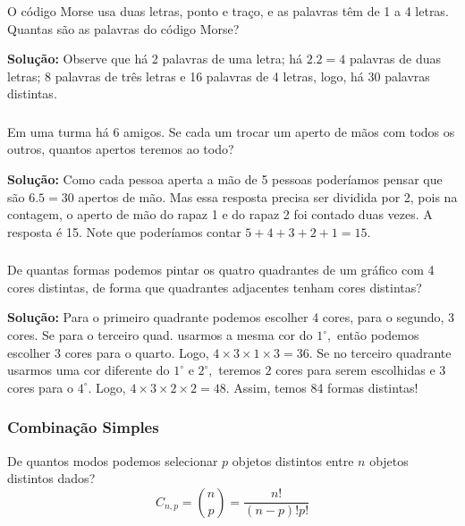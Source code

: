 \documentclass[14pt,aspectratio=1610]{beamer}
\begin{document}
\begin{frame}{}
\frametitle{}
\begin{block}{}
\justifying
O código Morse usa duas letras, ponto e traço, e as palavras têm de 1 a 4 letras. Quantas são as palavras do código Morse?\pause

{\bf Solução:} Observe que há 2 palavras de uma letra; há $2.2=4$ palavras de duas letras; 8 palavras de três letras e 16 palavras de 4 letras, logo, há 30 palavras distintas.
\end{block}
\end{frame}


\begin{frame}{}
\frametitle{}
\begin{block}{}
\justifying
Em uma turma há 6 amigos. Se cada um trocar um aperto de mãos com todos os outros, quantos apertos teremos ao todo?\pause

{\bf Solução:} Como cada pessoa aperta a mão de 5 pessoas poderíamos pensar que são $6.5=30$ apertos de mão. Mas essa resposta precisa ser dividida por 2, pois na contagem, o aperto de mão do rapaz 1 e do rapaz 2 foi contado duas vezes. A resposta é 15. Note que poderíamos contar $5+4+3+2+1=15.$
\end{block}
\end{frame}

\begin{frame}{}
\frametitle{}
\begin{block}{}
\justifying
De quantas formas podemos pintar os quatro quadrantes de um gráfico com 4 cores distintas, de forma que quadrantes adjacentes tenham cores distintas? \pause

{\bf Solução:} Para o primeiro quadrante podemos escolher 4 cores, para o segundo, 3 cores. Se para o terceiro quad. usarmos a mesma cor do $1^{\circ},$ então podemos escolher 3 cores para o quarto. Logo, $4\times 3 \times 1\times 3=36.$ Se no terceiro quadrante usarmos uma cor diferente do $1^{\circ}$ e $2^{\circ},$ teremos $2$ cores para serem escolhidas e 3 cores para o $4^{\circ}.$ Logo, $4\times 3\times 2\times 2 = 48.$ Assim, temos 84 formas distintas!
\end{block}
\end{frame}

\begin{frame}{}
\frametitle{Combinação Simples}
\begin{block}{}
\justifying
De quantos modos podemos selecionar $p$ objetos distintos entre $n$ objetos distintos dados?
$$C_{n,p}=\binom{n}{p}=\dfrac{n!}{(n-p)!p!}$$
\end{block}
\end{frame}
\end{document}
